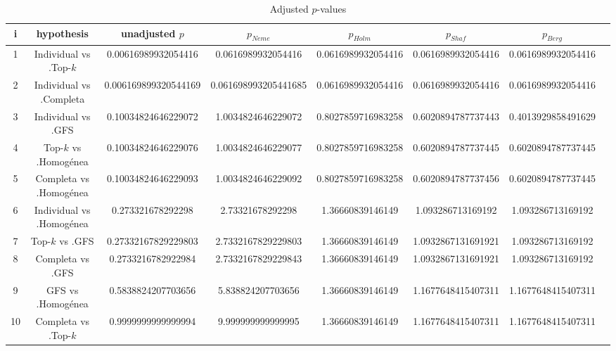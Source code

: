 \documentclass[a4paper,10pt]{article}
\begin{document}
\begin{landscape}
\begin{table}[!htp]
\centering\tiny
\caption{Adjusted $p$-values}
\begin{tabular}{cccccccc}
i&hypothesis&unadjusted $p$&$p_{Neme}$&$p_{Holm}$&$p_{Shaf}$&$p_{Berg}$\\
\hline
1&Individual vs .Top-$k$&0.00616989932054416&0.0616989932054416&0.0616989932054416&0.0616989932054416&0.0616989932054416\\
2&Individual vs .Completa&0.006169899320544169&0.061698993205441685&0.0616989932054416&0.0616989932054416&0.0616989932054416\\
3&Individual vs .GFS&0.10034824646229072&1.0034824646229072&0.8027859716983258&0.6020894787737443&0.4013929858491629\\
4&Top-$k$ vs .Homogénea&0.10034824646229076&1.0034824646229077&0.8027859716983258&0.6020894787737445&0.6020894787737445\\
5&Completa vs .Homogénea&0.10034824646229093&1.0034824646229092&0.8027859716983258&0.6020894787737456&0.6020894787737445\\
6&Individual vs .Homogénea&0.273321678292298&2.73321678292298&1.36660839146149&1.093286713169192&1.093286713169192\\
7&Top-$k$ vs .GFS&0.27332167829229803&2.7332167829229803&1.36660839146149&1.0932867131691921&1.093286713169192\\
8&Completa vs .GFS&0.2733216782922984&2.7332167829229843&1.36660839146149&1.0932867131691921&1.093286713169192\\
9&GFS vs .Homogénea&0.5838824207703656&5.838824207703656&1.36660839146149&1.1677648415407311&1.1677648415407311\\
10&Completa vs .Top-$k$&0.9999999999999994&9.999999999999995&1.36660839146149&1.1677648415407311&1.1677648415407311\\
\hline
\end{tabular}
\end{table}

\end{landscape}
\end{document}
